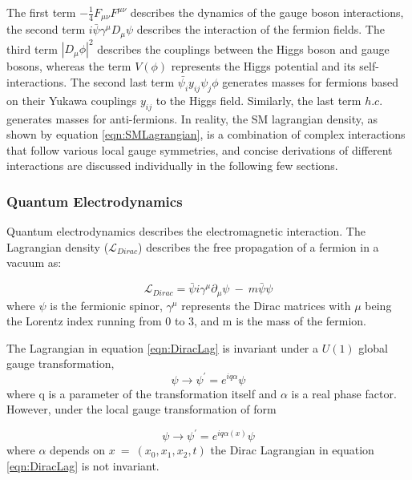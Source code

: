 The first term $-\frac{1}{4}F_{\mu\nu}F^{\mu\nu}$ describes the dynamics of the gauge boson interactions, the second term $i\bar{\psi}\gamma^{\mu}D_{\mu}\psi$ describes the interaction of the fermion fields. The third term $|D_{\mu}\phi|^{2}$ describes the couplings between the Higgs boson and gauge bosons, whereas the term $V(\phi)$ represents the Higgs potential and its self-interactions. The second last term $\bar{\psi_{i}}y_{ij}\psi_{j}\phi$ generates masses for fermions based on their Yukawa couplings $y_{ij}$ to the Higgs field. Similarly, the last term $h.c.$ generates masses for anti-fermions. In reality, the SM lagrangian density, as shown by equation \ref{eqn:SMLagrangian}, is a combination of complex interactions that follow various local gauge symmetries, and concise derivations of different interactions are discussed individually in the following few sections.
 
\subsubsection{Quantum Electrodynamics}
\label{subsubsec:QED}
Quantum electrodynamics describes the electromagnetic interaction. The Lagrangian density ($\mathcal{L}_{Dirac}$) describes the free propagation of a fermion in a vacuum as:  

\begin{equation}
\mathcal{L}_{Dirac} = \bar{\psi} i \gamma^{\mu} \partial_{\mu} \psi ~-~ m\bar{\psi}\psi
\label{eqn:DiracLag}
\end{equation}
where $\psi$ is the fermionic spinor, $\gamma^{\mu}$ represents the Dirac matrices with $\mu$ being the Lorentz index running from $0$ to $3$, and m is the mass of the fermion. 

The Lagrangian in equation \ref{eqn:DiracLag} is invariant under a $U(1)$ global gauge transformation, 
\begin{equation}
\psi\rightarrow \psi^{'}=e^{iq\alpha}\psi 
\label{eqn:QEDGlobalTrans}
\end{equation}
where q is a parameter of the transformation itself and $\alpha$ is a real phase factor. However, under the local gauge transformation of form 

\begin{equation}
\psi\rightarrow \psi^{'}=e^{iq\alpha(x)}\psi
\label{eqn:QEDLocalTrans}
\end{equation}
where $\alpha$ depends on $x~=~(x_{0},x_{1},x_{2},t)$ the Dirac Lagrangian in equation \ref{eqn:DiracLag} is not invariant. 

